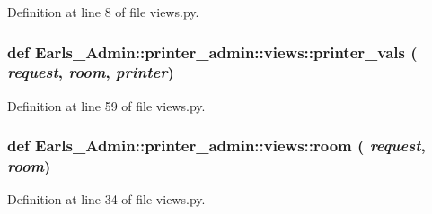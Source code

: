 Definition at line 8 of file views.py.\hypertarget{namespaceEarls__Admin_1_1printer__admin_1_1views_ddc42c5551d82f75bf3699381797c267}{
\subsubsection[printer\_\-vals]{\setlength{\rightskip}{0pt plus 5cm}def Earls\_\-Admin::printer\_\-admin::views::printer\_\-vals ( {\em request}, \/   {\em room}, \/   {\em printer})}}
\label{namespaceEarls__Admin_1_1printer__admin_1_1views_ddc42c5551d82f75bf3699381797c267}




Definition at line 59 of file views.py.\hypertarget{namespaceEarls__Admin_1_1printer__admin_1_1views_99bfbb487e555b869a6c3154f558a5ac}{
\subsubsection[room]{\setlength{\rightskip}{0pt plus 5cm}def Earls\_\-Admin::printer\_\-admin::views::room ( {\em request}, \/   {\em room})}}
\label{namespaceEarls__Admin_1_1printer__admin_1_1views_99bfbb487e555b869a6c3154f558a5ac}




Definition at line 34 of file views.py.